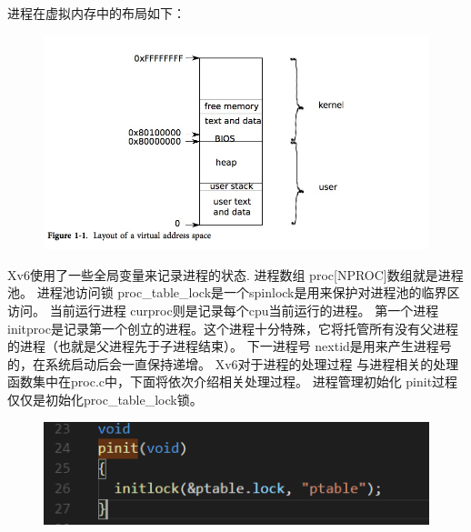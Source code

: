 \documentclass[a4paper,12pt]{report}
\begin{document}
进程在虚拟内存中的布局如下：
\begin{figure}[H]
	\centering
	\includegraphics [width=1.0\textwidth]{figure//image102.png}
\end{figure}
Xv6使用了一些全局变量来记录进程的状态.
进程数组 proc[NPROC]数组就是进程池。
进程池访问锁 proc\_table\_lock是一个spinlock是用来保护对进程池的临界区访问。
当前运行进程 curproc则是记录每个cpu当前运行的进程。
第一个进程 initproc是记录第一个创立的进程。这个进程十分特殊，它将托管所有没有父进程的进程（也就是父进程先于子进程结束）。
下一进程号 nextid是用来产生进程号的，在系统启动后会一直保持递增。
Xv6对于进程的处理过程
与进程相关的处理函数集中在proc.c中，下面将依次介绍相关处理过程。
进程管理初始化
pinit过程仅仅是初始化proc\_table\_lock锁。
\begin{figure}[H]
	\centering
	\includegraphics [width=1.0\textwidth]{figure//image103.png}
\end{figure}
\end{document}
